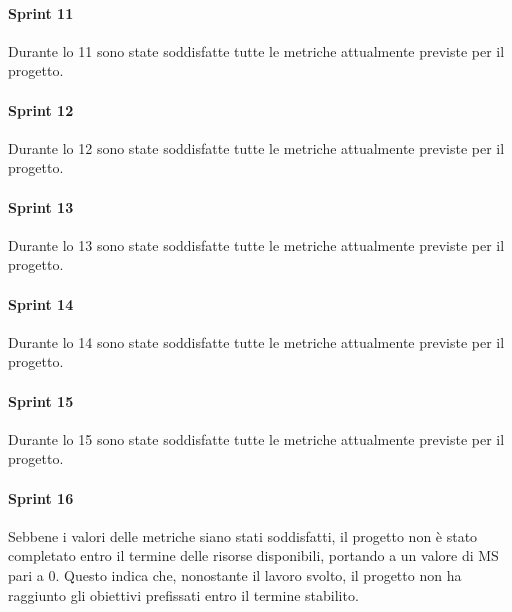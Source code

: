\paragraph{Sprint 11}
Durante lo  11 sono state soddisfatte tutte le metriche attualmente previste per il progetto. 

\paragraph{Sprint 12}
Durante lo  12 sono state soddisfatte tutte le metriche attualmente previste per il progetto. 

\paragraph{Sprint 13}
Durante lo  13 sono state soddisfatte tutte le metriche attualmente previste per il progetto.

\paragraph{Sprint 14}
Durante lo  14 sono state soddisfatte tutte le metriche attualmente previste per il progetto.

\paragraph{Sprint 15}
Durante lo  15 sono state soddisfatte tutte le metriche attualmente previste per il progetto.

\paragraph{Sprint 16}
Sebbene i valori delle metriche siano stati soddisfatti, il progetto non è stato completato entro il termine delle risorse disponibili,
portando a un valore di MS pari a 0. Questo indica che, nonostante il lavoro svolto, il progetto non ha raggiunto gli obiettivi prefissati entro il termine stabilito.